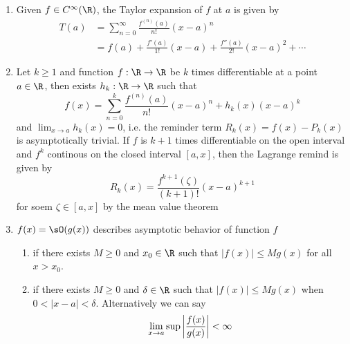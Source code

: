 \documentclass[11pt]{article}
\begin{document}
\begin{enumerate}
\begin{enumerate}
    \end{enumerate}
    \item {} Given $f \in C^{\infty}(\R)$, the Taylor expansion of $f$ at $a$ is given by 
    \begin{align*}
        T(a)
        &= \sum_{n=0}^{\infty} \frac{f^{(n)}(a)}{n!} (x-a)^n \\
        &= f(a) + \frac{f'(a)}{1!}(x-a) + \frac{f''(a)}{2!} (x-a)^2 + \cdots
    \end{align*}
    \item {} Let $k\geq 1$ and function $f:\R\to\R$ be $k$ times differentiable at a point $a\in \R$, then exists $h_k:\R\to\R$ such that 
    \[
        f(x)
        = \sum_{n=0}^{k} \frac{f^{(n)}(a)}{n!} (x-a)^n + h_k(x) (x-a)^k
    \]
    and $\lim_{x\to a} h_k(x) = 0$, i.e. the reminder term $R_k(x) = f(x) - P_k(x)$ is asymptotically trivial. If $f$ is $k+1$ times differentiable on the open interval and $f^k$ continous on the closed interval $[a,x]$, then the Lagrange remind is given by 
    \[
        R_k(x) = \frac{f^{k+1}(\zeta)}{(k+1)!} (x-a)^{k+1}
    \]
    for soem $\zeta \in [a,x]$ by the mean value theorem
    \item {} $f(x) = \sO(g(x))$   describes asymptotic behavior of function $f$
    \begin{enumerate}
        \item {} if there exists $M\geq 0$ and $x_0\in\R$ such that $|f(x)| \leq M g(x)$ for all $x>x_0$. 
        \item {} if there exists $M\geq 0$ and $\delta \in\R$ such that $|f(x)| \leq M g(x)$ when $0 < |x-a| < \delta$. Alternatively we can say 
        \[
            \lim_{x\to a} \sup \left|\frac{f(x)}{g(x)}\right| < \infty
        \]
    \end{enumerate}
\end{enumerate}


\subsection{}
\end{document}

